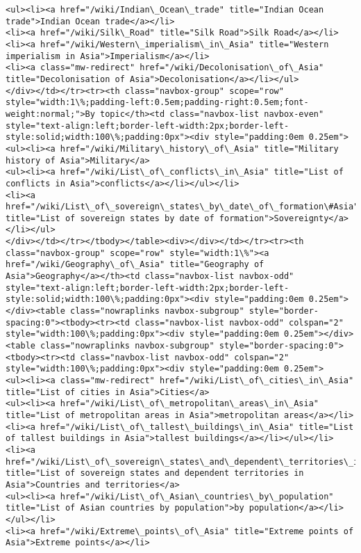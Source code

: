 \documentclass[11pt]{article}
\begin{document}
\begin{Verbatim}[commandchars=\\\{\}]
<ul><li><a href="/wiki/Indian\_Ocean\_trade" title="Indian Ocean trade">Indian Ocean trade</a></li>
<li><a href="/wiki/Silk\_Road" title="Silk Road">Silk Road</a></li>
<li><a href="/wiki/Western\_imperialism\_in\_Asia" title="Western imperialism in Asia">Imperialism</a></li>
<li><a class="mw-redirect" href="/wiki/Decolonisation\_of\_Asia" title="Decolonisation of Asia">Decolonisation</a></li></ul>
</div></td></tr><tr><th class="navbox-group" scope="row" style="width:1\%;padding-left:0.5em;padding-right:0.5em;font-weight:normal;">By topic</th><td class="navbox-list navbox-even" style="text-align:left;border-left-width:2px;border-left-style:solid;width:100\%;padding:0px"><div style="padding:0em 0.25em">
<ul><li><a href="/wiki/Military\_history\_of\_Asia" title="Military history of Asia">Military</a>
<ul><li><a href="/wiki/List\_of\_conflicts\_in\_Asia" title="List of conflicts in Asia">conflicts</a></li></ul></li>
<li><a href="/wiki/List\_of\_sovereign\_states\_by\_date\_of\_formation\#Asia" title="List of sovereign states by date of formation">Sovereignty</a></li></ul>
</div></td></tr></tbody></table><div></div></td></tr><tr><th class="navbox-group" scope="row" style="width:1\%"><a href="/wiki/Geography\_of\_Asia" title="Geography of Asia">Geography</a></th><td class="navbox-list navbox-odd" style="text-align:left;border-left-width:2px;border-left-style:solid;width:100\%;padding:0px"><div style="padding:0em 0.25em"></div><table class="nowraplinks navbox-subgroup" style="border-spacing:0"><tbody><tr><td class="navbox-list navbox-odd" colspan="2" style="width:100\%;padding:0px"><div style="padding:0em 0.25em"></div><table class="nowraplinks navbox-subgroup" style="border-spacing:0"><tbody><tr><td class="navbox-list navbox-odd" colspan="2" style="width:100\%;padding:0px"><div style="padding:0em 0.25em">
<ul><li><a class="mw-redirect" href="/wiki/List\_of\_cities\_in\_Asia" title="List of cities in Asia">Cities</a>
<ul><li><a href="/wiki/List\_of\_metropolitan\_areas\_in\_Asia" title="List of metropolitan areas in Asia">metropolitan areas</a></li>
<li><a href="/wiki/List\_of\_tallest\_buildings\_in\_Asia" title="List of tallest buildings in Asia">tallest buildings</a></li></ul></li>
<li><a href="/wiki/List\_of\_sovereign\_states\_and\_dependent\_territories\_in\_Asia" title="List of sovereign states and dependent territories in Asia">Countries and territories</a>
<ul><li><a href="/wiki/List\_of\_Asian\_countries\_by\_population" title="List of Asian countries by population">by population</a></li></ul></li>
<li><a href="/wiki/Extreme\_points\_of\_Asia" title="Extreme points of Asia">Extreme points</a></li>

\end{Verbatim}
\end{document}
